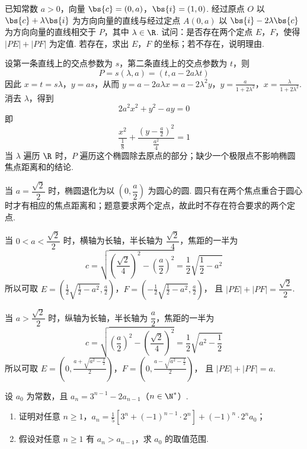 \begin{problem}
已知常数 \(a > 0\)，向量 \(\bs{c} = (0, a)\)，\(\bs{i} = (1, 0)\). 经过原点 \(O\) 以 \(\bs{c} + \lambda \bs{i}\) 为方向向量的直线与经过定点 \(A(0, a)\) 以 \(\bs{i} - 2\lambda \bs{c}\) 为方向向量的直线相交于 \(P\)，其中 \(\lambda \in \R\). 试问：是否存在两个定点 \(E\)，\(F\)，使得 \(|PE| + |PF|\) 为定值. 若存在，求出 \(E\)，\(F\) 的坐标；若不存在，说明理由.
\end{problem}

\begin{solution}
设第一条直线上的交点参数为 \(s\)，第二条直线上的交点参数为 \(t\)，则
\[
P=s(\lambda,a)=(t,a-2a\lambda t)
\]
因此 \(x=t=s\lambda\)，\(y=as\)，从而
\(y=a-2a\lambda x=a-2\lambda^2y\)，\(y=\frac{a}{1+2\lambda^2}\)，\(x=\frac{\lambda}{1+2\lambda^2}\).
消去 \(\lambda\)，得到
\[
2a^2x^2+y^2-ay=0
\]
即
\[
\frac{x^2}{\frac{1}{8}}+\frac{\left(y-\frac a2\right)^2}{\frac{a^2}{4}}=1
\]
当 \(\lambda\) 遍历 \(\R\) 时，\(P\) 遍历这个椭圆除去原点的部分；缺少一个极限点不影响椭圆焦点距离和的结论.

当 \(a=\dfrac{\sqrt2}{2}\) 时，椭圆退化为以 \((0,\dfrac a2)\) 为圆心的圆. 圆只有在两个焦点重合于圆心时才有相应的焦点距离和；题意要求两个定点，故此时不存在符合要求的两个定点.

当 \(0<a<\dfrac{\sqrt2}{2}\) 时，横轴为长轴，半长轴为 \(\dfrac{\sqrt2}{4}\)，焦距的一半为
\[
c=\sqrt{\left(\frac{\sqrt2}{4}\right)^2-\left(\frac a2\right)^2}=\frac12\sqrt{\frac12-a^2}
\]
所以可取
\(E=\left(\frac12\sqrt{\frac12-a^2},\frac a2\right)\)，\(F=\left(-\frac12\sqrt{\frac12-a^2},\frac a2\right)\)，
且 \(|PE|+|PF|=\dfrac{\sqrt2}{2}\).

当 \(a>\dfrac{\sqrt2}{2}\) 时，纵轴为长轴，半长轴为 \(\dfrac a2\)，焦距的一半为
\[
c=\sqrt{\left(\frac a2\right)^2-\left(\frac{\sqrt2}{4}\right)^2}=\frac12\sqrt{a^2-\frac12}
\]
所以可取
\(E=\left(0,\frac{a+\sqrt{a^2-\frac12}}2\right)\)，\(F=\left(0,\frac{a-\sqrt{a^2-\frac12}}2\right)\)，
且 \(|PE|+|PF|=a\).
\end{solution}

\begin{problem}
设 \(a_0\) 为常数，且 \(a_n = 3^{n-1} - 2a_{n-1}\)（\(n \in \N^*\)）.

\begin{enumerate}
\item 证明对任意 \(n \geqslant 1\)，\(a_n = \frac{1}{5} \left[3^n + (-1)^{n-1} \cdot 2^n\right] + (-1)^n \cdot 2^n a_0\)；
\item 假设对任意 \(n \geqslant 1\) 有 \(a_n > a_{n-1}\)，求 \(a_0\) 的取值范围.
\end{enumerate}
\end{problem}

